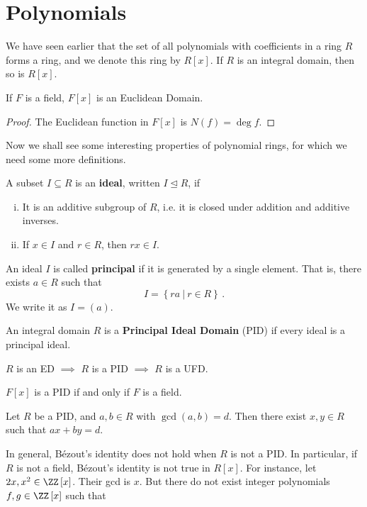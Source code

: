 \documentclass[11pt]{scrartcl}
\begin{document}
\section{Polynomials}
We have seen earlier that the set of all polynomials with coefficients in a ring \(R\) forms a ring, and we denote this ring by \(R [x]\). If \(R\) is an integral domain, then so is \(R[x]\).
\begin{proposition}
If \(F\) is a field, \(F[x]\) is an Euclidean Domain.
\end{proposition}
\begin{proof}
The Euclidean function in \(F[x]\) is \(N \left(f\right) = \deg f\).
\end{proof}
Now we shall see some interesting properties of polynomial rings, for which we need some more definitions.
\begin{defn}[Ideal]
A subset \(I \subseteq R\) is an \textbf{ideal}, written \(I \unlhd R\), if
\begin{enumerate}[(i)]
\item It is an additive subgroup of \(R\), i.e. it is closed under addition and
additive inverses.
\item If \(x \in I\) and \(r \in R\), then \(rx \in I\).
\end{enumerate}
An ideal \(I\) is called \textbf{principal} if it is generated by a single element. That is, there exists \(a \in R\) such that
\[ I = \left\{ra \ | \ r \in R\right\} \,. \]
We write it as \(I = (a)\).
\end{defn}
\begin{defn}
An integral domain \(R\) is a \textbf{Principal Ideal Domain} (PID) if every ideal is a principal ideal.
\end{defn}
\begin{proposition}
\(R\) is an ED \(\implies\) \(R\) is a PID \(\implies\) \(R\) is a UFD.
\end{proposition}
\begin{proposition}
\(F[x]\) is a PID if and only if \(F\) is a field.
\end{proposition}
\begin{theorem}
Let \(R\) be a PID, and \(a , b \in R\) with \(\gcd \left(a,b\right) = d\). Then there exist \(x,y \in R\) such that \(ax+by = d\).
\end{theorem}
In general, Bézout's identity does not hold when \(R\) is not a PID. In particular, if \(R\) is not a field, Bézout's identity is not true in \(R[x]\). For instance, let \(2x , x^2 \in \ZZ \left[x\right] \). Their gcd is \(x\). But there do not exist integer polynomials \(f,g \in \ZZ \left[x\right] \) such that
\end{document}
